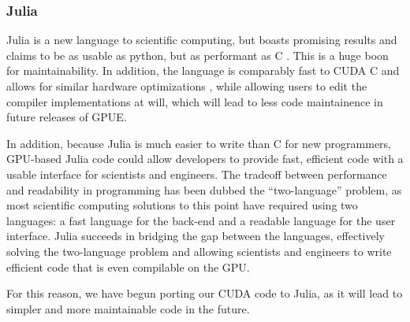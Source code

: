 \subsubsection{Julia}
Julia is a new language to scientific computing, but boasts promising results and claims to be as usable as python, but as performant as C .
This is a huge boon for maintainability.
In addition, the language is comparably fast to CUDA C and allows for similar hardware optimizations \cite{besard2016, besard2018}, while allowing users to edit the compiler implementations at will, which will lead to less code maintainence in future releases of GPUE.

In addition, because Julia is much easier to write than C for new programmers, GPU-based Julia code could allow developers to provide fast, efficient code with a usable interface for scientists and engineers.
The tradeoff between performance and readability in programming has been dubbed the ``two-language'' problem, as most scientific computing solutions to this point have required using two languages: a fast language for the back-end and a readable language for the user interface.
Julia succeeds in bridging the gap between the languages, effectively solving the two-language problem and allowing scientists and engineers to write efficient code that is even compilable on the GPU.

For this reason, we have begun porting our CUDA code to Julia, as it will lead to simpler and more maintainable code in the future.
